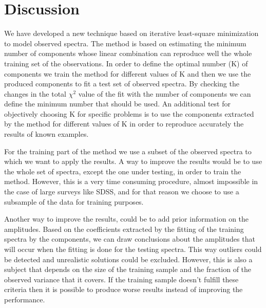 \documentclass[apj]{emulateapj}
\begin{document}
\section{Discussion}\label{discussion}
We have developed a new technique based on iterative least-square minimization to model observed spectra. The method is based on estimating the minimum number of components whose linear combination can reproduce well the whole training set of the observations. In order to define the optimal number (K) of components we train the method for different values of K and then we use the produced components to fit a test set of observed spectra. By checking the changes in the total $\chi^2$ value of the fit with the number of components we can define the minimum number that should be used. An additional test for objectively choosing K for specific problems is to use the components extracted by the method for different values of K in order to reproduce accurately the results of known examples.

For the training part of the method we use a subset of the observed spectra to which we want to apply the results. A way to improve the results would be to use the whole set of spectra, except the one under testing, in order to train the method. However, this is a very time consuming procedure, almost impossible in the case of large surveys like SDSS, and for that reason we choose to use a subsample of the data for training purposes.

Another way to improve the results, could be to add prior information on the amplitudes. Based on the coefficients extracted by the fitting of the training spectra by the components, we can draw conclusions about the amplitudes that will occur when the fitting is done for the testing spectra. This way outliers could be detected and unrealistic solutions could be excluded. However, this is also a subject that depends on the size of the training sample and the fraction of the observed variance that it covers. If the training sample doesn't fulfill these criteria then it is possible to produce worse results instead of improving the performance.
\end{document}
